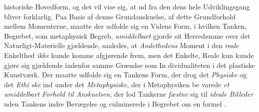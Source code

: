 historiske Hovedform, og det vil vise sig, at ud fra den dens
hele Udviklingsgang bliver forklarlig. Paa Basis af denne
Grundanskuelse, af dette Grundforhold mellem Momenterne,
maatte der udfolde sig en Videns Form, i hvilken Tanken,
Begrebet, som metaphysisk Begreb, \emph{umiddelbart} gjorde sit
Herredømme over det Naturligt-Materielle gjældende, saaledes,
at \emph{Andethedens} Moment i den \emph{reale} Enkelthed \emph{ikke}
kunde komme afgjørende frem, men det Enkelte, Reale kun
kunde gjøre sig gjældende indenfor samme Grændse som In\-%
dividualiteten i det plastiske Kunstværk. Der maatte udfolde
sig en Tankens Form, der drog det \emph{Physiske} og det \emph{Ethi\-%
ske} ind under det \emph{Metaphysiske}, der i Metaphysiken be\-%
varede \emph{et umiddelbart Forhold til Anskuelsen}, der
lod Tankerne \emph{fæstne} sig til \emph{ideale Billeder} uden Tankens
indre Bevægelse og culminerede i Begrebet om en formel
.

